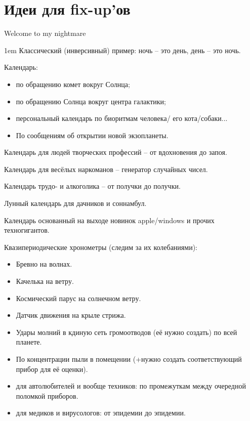 \section{Идеи для fix-up'ов} %
\subtitle{От сотворения мира в звёздном храме до тепловой смерти Вселенной}
\begin{epigraph}
    Welcome to my nightmare
\end{epigraph}
\begin{flushleft}\parskip1em
    Классический (инверсивный) пример: ночь -- это день, день -- это ночь.

    Календарь:
    \begin{itemize}
        \item по обращению комет вокруг Солнца;
        \item по обращению Солнца вокруг центра галактики;
        \item персональный календарь по биоритмам человека/ его кота/собаки...
        \item По сообщениям об открытии новой экзопланеты.
    \end{itemize}

    Календарь для людей творческих профессий -- от вдохновения до запоя.

    Календарь для весёлых наркоманов -- генератор случайных чисел.

    Календарь трудо- и алкоголика -- от получки до получки.

    Лунный календарь для дачников и соннамбул.

    Календарь основанный на выходе новинок apple/windows и прочих техногигантов.

    Квазипериодические хронометры (следим за их колебаниями):
    \begin{itemize}
        \item Бревно на волнах.
        \item Качелька на ветру.
        \item Космический парус на солнечном ветру.
        \item Датчик движения на крыле стрижа.
        \item Удары молний в кдиную сеть громоотводов (её нужно создать) по всей планете.
        \item По концентрации пыли в помещении (+нужно создать соответствующий прибор для её оценки).
        \item для автолюбителей и вообще техников: по промежуткам между очередной поломкой приборов.
        \item для медиков и вирусологов: от эпидемии до эпидемии.
    \end{itemize}


\end{flushleft}
